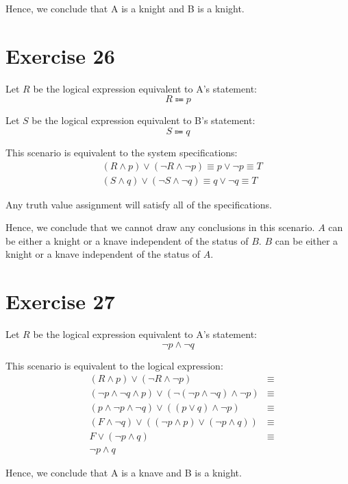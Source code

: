 \documentclass{article}
\begin{document}
Hence, we conclude that A is a knight and B is a knight.

\pagebreak

\section{Exercise 26}
Let $R$ be the logical expression equivalent to A's statement:
\[
	R \Coloneqq p
\]

Let $S$ be the logical expression equivalent to B's statement:
\[
	S \Coloneqq q
\]

This scenario is equivalent to the system specifications:
\begin{align*}
	 & (R \land p) \lor (\neg R \land \neg p) \equiv p \lor \neg p \equiv T \\
	 & (S \land q) \lor (\neg S \land \neg q) \equiv q \lor \neg q \equiv T
\end{align*}

Any truth value assignment will satisfy all of the specifications.

Hence, we conclude that we cannot draw any conclusions in this scenario. $A$ can be either a knight or a knave independent of the status of $B$. $B$ can be either a knight or a knave independent of the status of $A$.

\pagebreak

\section{Exercise 27}
Let $R$ be the logical expression equivalent to A's statement:
\[
	\neg p \land \neg q
\]

This scenario is equivalent to the logical expression:
\begin{align*}
	 & (R \land p) \lor (\neg R \land \neg p)                                       & \equiv \\
	 & (\neg p \land \neg q \land p) \lor (\neg (\neg p \land \neg q) \land \neg p) & \equiv \\
	 & (p \land \neg p \land \neg q) \lor ((p \lor q) \land \neg p)                 & \equiv \\
	 & (F \land \neg q) \lor ((\neg p \land p) \lor (\neg p \land q))               & \equiv \\
	 & F \lor (\neg p \land q)                                                      & \equiv \\
	 & \neg p \land q
\end{align*}

Hence, we conclude that A is a knave and B is a knight.
\end{document}
